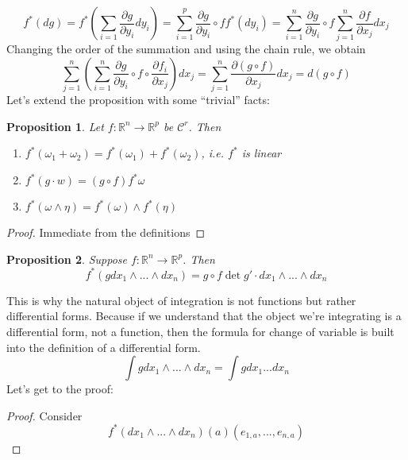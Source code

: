 \documentclass{article}
\newtheorem{proposition}{Proposition}
\newcommand{\reals}[0]{\mathbb{R}}
\newcommand{\mc}[1]{\mathcal{#1}}
\newcommand{\prt}[2]{\frac{\partial #1}{\partial #2}}
\begin{document}
\begin{equation}
  f^*(dg) = f^*\left(\sum_{i = 1}\prt{g}{y_i}dy_i\right) = \sum_{i = 1}^p\prt{g}{y_i} \circ ff^*(dy_i) = \sum_{i = 1}^n\prt{g}{y_i} \circ f\sum_{j = 1}^n\prt{f}{x_j}dx_j
\end{equation}
Changing the order of the summation and using the chain rule, we obtain
\begin{equation}
  \sum_{j = 1}^n\left(\sum_{i = 1}^n\prt{g}{y_i}\circ f \circ \prt{f_i}{x_j}\right)dx_j = \sum_{j = 1}^n\prt{(g \circ f)}{x_j}dx_j = d(g \circ f)
\end{equation}
Let's extend the proposition with some ``trivial'' facts:
\begin{proposition}
  Let \(f: \reals^n \to \reals^p\) be \(\mc{C}^r\). Then
  \begin{enumerate}

    \item \(f^*(\omega_1 + \omega_2) = f^*(\omega_1) + f^*(\omega_2)\), i.e. \(f^*\) is linear

    \item \(f^*(g \cdot w) = (g \circ f)f^*\omega\)

    \item \(f^*(\omega \wedge \eta) = f^*(\omega) \wedge f^*(\eta)\)

  \end{enumerate}
\end{proposition}
\begin{proof}
  Immediate from the definitions
\end{proof}
\begin{proposition}
  Suppose \(f: \reals^n \to \reals^p\). Then
  \begin{equation}
    f^*(gdx_1 \wedge ... \wedge dx_n) = g \circ f\det g' \cdot dx_1 \wedge ... \wedge dx_n
  \end{equation}
\end{proposition}
This is why the natural object of integration is not functions but rather differential forms. Because if we understand that the object we're integrating is a differential form, not a function, then the formula for change of variable is built into the definition of a differential form.
\begin{equation}
  \int gdx_1 \wedge ... \wedge dx_n = \int gdx_1...dx_n
\end{equation}
Let's get to the proof:
\begin{proof}
  Consider
  \begin{equation}
    f^*(dx_1 \wedge ... \wedge dx_n)(a)(e_{1,a},...,e_{n,a})
  \end{equation}
\end{proof}
\end{document}
